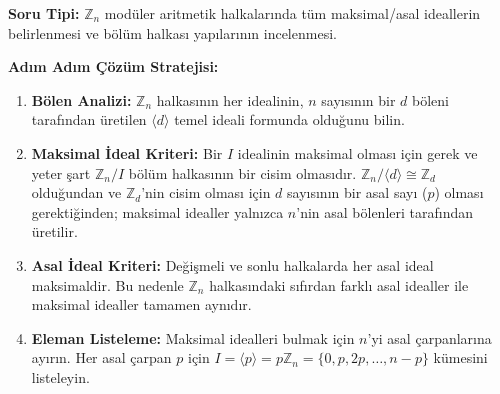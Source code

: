 \documentclass[11pt, a4paper]{article}
\begin{document}
\begin{konubox}[title={\faGraduationCap\enspace Soru Tipi ve Adım Adım Çözüm Stratejisi}]
\textbf{Soru Tipi:} $\mathbb{Z}_n$ modüler aritmetik halkalarında tüm maksimal/asal ideallerin belirlenmesi ve bölüm halkası yapılarının incelenmesi.

\textbf{Adım Adım Çözüm Stratejisi:}
\begin{enumerate}
    \item \textbf{Bölen Analizi:} $\mathbb{Z}_n$ halkasının her idealinin, $n$ sayısının bir $d$ böleni tarafından üretilen $\langle d \rangle$ temel ideali formunda olduğunu bilin.
    \item \textbf{Maksimal İdeal Kriteri:} Bir $I$ idealinin maksimal olması için gerek ve yeter şart $\mathbb{Z}_n / I$ bölüm halkasının bir cisim olmasıdır. $\mathbb{Z}_n / \langle d \rangle \cong \mathbb{Z}_d$ olduğundan ve $\mathbb{Z}_d$'nin cisim olması için $d$ sayısının bir asal sayı ($p$) olması gerektiğinden; maksimal idealler yalnızca $n$'nin asal bölenleri tarafından üretilir.
    \item \textbf{Asal İdeal Kriteri:} Değişmeli ve sonlu halkalarda her asal ideal maksimaldir. Bu nedenle $\mathbb{Z}_n$ halkasındaki sıfırdan farklı asal idealler ile maksimal idealler tamamen aynıdır.
    \item \textbf{Eleman Listeleme:} Maksimal idealleri bulmak için $n$'yi asal çarpanlarına ayırın. Her asal çarpan $p$ için $I = \langle p \rangle = p\mathbb{Z}_n = \{0, p, 2p, \dots, n-p\}$ kümesini listeleyin.
\end{enumerate}
\end{konubox}
\newpage
\end{document}
